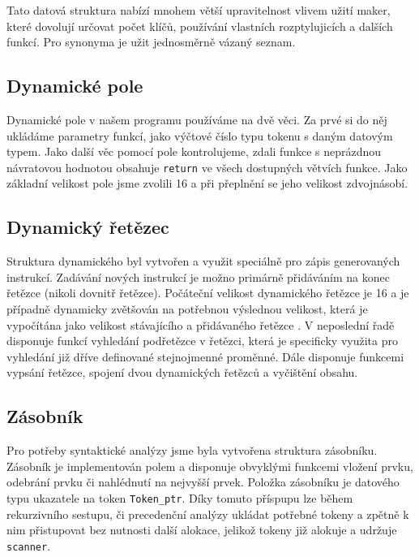 \documentclass[a4paper, 11pt]{article}
\begin{document}
Tato datová struktura nabízí mnohem větší upravitelnost vlivem užití maker, které dovolují určovat počet klíčů, používání vlastních rozptylujicích a dalších funkcí. 
Pro synonyma je užit jednosměrně vázaný seznam.

\subsection{Dynamické pole}

Dynamické pole v našem programu používáme na dvě věci. 
Za prvé si do něj ukládáme parametry funkcí, jako výčtové číslo typu tokenu s daným datovým typem.
Jako další věc pomocí pole kontrolujeme, zdali funkce s neprázdnou návratovou hodnotou obsahuje \verb|return| ve všech dostupných větvích funkce. 
Jako základní velikost pole jsme zvolili 16 a při přeplnění se jeho velikost zdvojnásobí.

\subsection{Dynamický řetězec}

Struktura dynamického byl vytvořen a využit speciálně pro zápis generovaných instrukcí. 
Zadávání nových instrukcí je možno primárně přidáváním na konec řetězce (nikoli dovnitř řetězce).  
Počáteční velikost dynamického řetězce je 16 a je případně dynamicky zvětšován na potřebnou výslednou velikost, která je vypočítána jako velikost stávajícího a přidávaného řetězce \cite{el-str}. 
V neposlední řadě disponuje funkcí vyhledání podřetězce v řetězci, která je specificky využita pro vyhledání již dříve definované stejnojmenné proměnné. 
Dále disponuje funkcemi vypsání řetězce, spojení dvou dynamických řetězců a vyčištění obsahu.

\subsection{Zásobník}

Pro potřeby syntaktické analýzy jsme byla vytvořena struktura zásobníku. 
Zásobník je implementován polem a disponuje obvyklými funkcemi vložení prvku, odebrání prvku či nahlédnutí na nejvyšší prvek. 
Položka zásobníku je datového typu ukazatele na token \verb|Token_ptr|. 
Díky tomuto příspupu lze během rekurzivního sestupu, či precedenční analýzy ukládat potřebné tokeny a zpětně k nim přistupovat bez nutnosti další alokace, jelikož tokeny již alokuje a udržuje \verb|scanner|.

\end{document}
